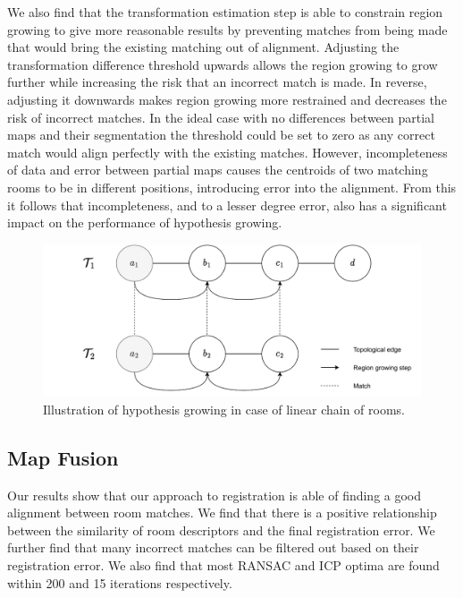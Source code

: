 We also find that the transformation estimation step is able to constrain region growing to give more reasonable results by preventing matches from being made that would bring the existing matching out of alignment. Adjusting the transformation difference threshold upwards allows the region growing to grow further while increasing the risk that an incorrect match is made. In reverse, adjusting it downwards makes region growing more restrained and decreases the risk of incorrect matches. In the ideal case with no differences between partial maps and their segmentation the threshold could be set to zero as any correct match would align perfectly with the existing matches. However, incompleteness of data and error between partial maps causes the centroids of two matching rooms to be in different positions, introducing error into the alignment. From this it follows that incompleteness, and to a lesser degree error, also has a significant impact on the performance of hypothesis growing.

\pagebreak

\begin{figure}[h]
    \centering
    \includegraphics*[width=\textwidth]{./fig/hypothesis_Growing_ideal_chain.drawio.pdf}
    \caption{Illustration of hypothesis growing in case of linear chain of rooms.}
    \label{fig:hypothesis_growing_chain}

\end{figure}



\subsection{Map Fusion}

Our results show that our approach to registration is able of finding a good alignment between room matches. We find that there is a positive relationship between the similarity of room descriptors and the final registration error.  We further find that many incorrect matches can be filtered out based on their registration error. We also find that most RANSAC and ICP optima are found within 200 and 15 iterations respectively.

